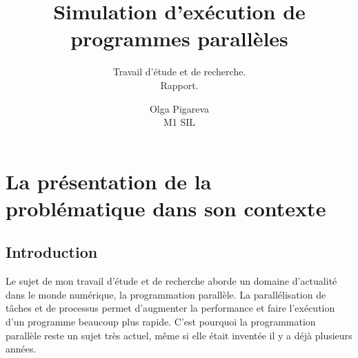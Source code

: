 \documentclass[12pt]{scrartcl}
\begin{document}
\pagestyle{fancy}
\rhead{  }

\title{%
Simulation d'exécution de programmes parallèles\\
\large } 

\subtitle{ Travail d'étude et de recherche. \\Rapport. }
\author{Olga Pigareva\\
M1 SIL} %






\maketitle

\newpage

\tableofcontents %

\newpage %
\section{La présentation de la problématique dans son contexte}

\subsection{Introduction}
Le sujet de mon travail d'étude et de recherche aborde un domaine d'actualité dans le monde numérique, la programmation parallèle.
La parallélisation de tâches et de processus permet d'augmenter la performance et faire l'exécution d'un programme beaucoup plus rapide. 
C'est pourquoi la programmation parallèle reste un sujet très actuel, même si elle était inventée il y a déjà plusieurs années.\\
\end{document}
